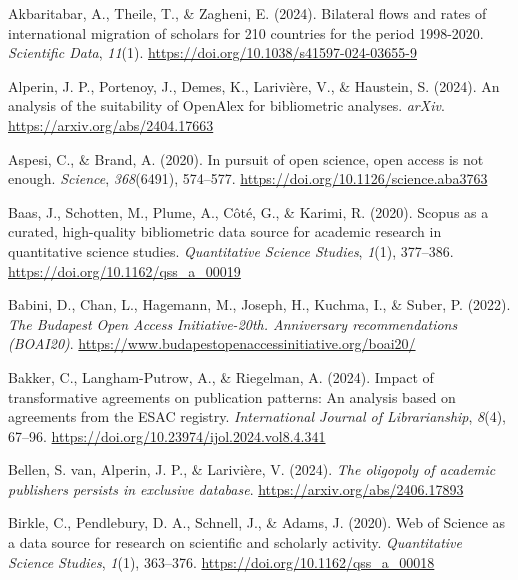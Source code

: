 \documentclass[a4paper,man,floatsintext,longtable,noextraspace,10pt]{apa6}
\newlength{\cslhangindent}
\newenvironment{CSLReferences}[2] %
{\begin{list}{}{%
  \setlength{\itemindent}{0pt}
  \setlength{\leftmargin}{0pt}
  \setlength{\parsep}{0pt}
  \ifodd #1
  \setlength{\leftmargin}{\cslhangindent}
  \setlength{\itemindent}{-1\cslhangindent}
  \fi
  \setlength{\itemsep}{#2\baselineskip}}}
{\end{list}}
\begin{document}
\label{refs}
\begin{CSLReferences}{1}{0}
Akbaritabar, A., Theile, T., \& Zagheni, E. (2024). Bilateral flows and
rates of international migration of scholars for 210 countries for the
period 1998-2020. \emph{Scientific Data}, \emph{11}(1).
\url{https://doi.org/10.1038/s41597-024-03655-9}

Alperin, J. P., Portenoy, J., Demes, K., Larivière, V., \& Haustein, S.
(2024). An analysis of the suitability of OpenAlex for bibliometric
analyses. \emph{arXiv}. \url{https://arxiv.org/abs/2404.17663}

Aspesi, C., \& Brand, A. (2020). In pursuit of open science, open access
is not enough. \emph{Science}, \emph{368}(6491), 574--577.
\url{https://doi.org/10.1126/science.aba3763}

Baas, J., Schotten, M., Plume, A., Côté, G., \& Karimi, R. (2020).
Scopus as a curated, high-quality bibliometric data source for academic
research in quantitative science studies. \emph{Quantitative Science
Studies}, \emph{1}(1), 377--386.
\url{https://doi.org/10.1162/qss_a_00019}

Babini, D., Chan, L., Hagemann, M., Joseph, H., Kuchma, I., \& Suber, P.
(2022). \emph{{The Budapest Open Access Initiative-20th. Anniversary
recommendations (BOAI20)}}.
\url{https://www.budapestopenaccessinitiative.org/boai20/}

Bakker, C., Langham-Putrow, A., \& Riegelman, A. (2024). Impact of
transformative agreements on publication patterns: An analysis based on
agreements from the ESAC registry. \emph{International Journal of
Librarianship}, \emph{8}(4), 67--96.
\url{https://doi.org/10.23974/ijol.2024.vol8.4.341}

Bellen, S. van, Alperin, J. P., \& Larivière, V. (2024). \emph{The
oligopoly of academic publishers persists in exclusive database}.
\url{https://arxiv.org/abs/2406.17893}

Birkle, C., Pendlebury, D. A., Schnell, J., \& Adams, J. (2020). {Web of
Science} as a data source for research on scientific and scholarly
activity. \emph{Quantitative Science Studies}, \emph{1}(1), 363--376.
\url{https://doi.org/10.1162/qss_a_00018}


\end{CSLReferences}
\end{document}
